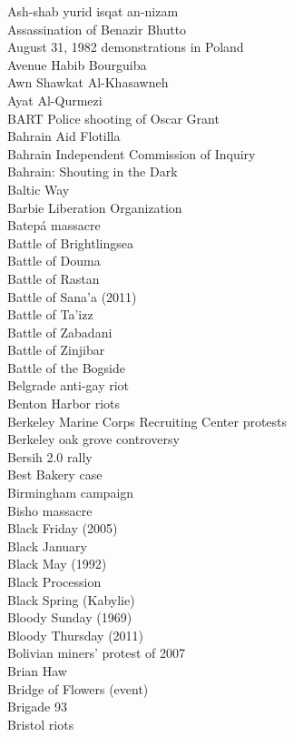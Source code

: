 Ash-shab yurid isqat an-nizam\\
Assassination of Benazir Bhutto\\
August 31, 1982 demonstrations in Poland\\
Avenue Habib Bourguiba\\
Awn Shawkat Al-Khasawneh\\
Ayat Al-Qurmezi\\
BART Police shooting of Oscar Grant\\
Bahrain Aid Flotilla\\
Bahrain Independent Commission of Inquiry\\
Bahrain: Shouting in the Dark\\
Baltic Way\\
Barbie Liberation Organization\\
Batepá massacre\\
Battle of Brightlingsea\\
Battle of Douma\\
Battle of Rastan\\
Battle of Sana'a (2011)\\
Battle of Ta'izz\\
Battle of Zabadani\\
Battle of Zinjibar\\
Battle of the Bogside\\
Belgrade anti-gay riot\\
Benton Harbor riots\\
Berkeley Marine Corps Recruiting Center protests\\
Berkeley oak grove controversy\\
Bersih 2.0 rally\\
Best Bakery case\\
Birmingham campaign\\
Bisho massacre\\
Black Friday (2005)\\
Black January\\
Black May (1992)\\
Black Procession\\
Black Spring (Kabylie)\\
Bloody Sunday (1969)\\
Bloody Thursday (2011)\\
Bolivian miners' protest of 2007\\
Brian Haw\\
Bridge of Flowers (event)\\
Brigade 93\\
Bristol riots\\
